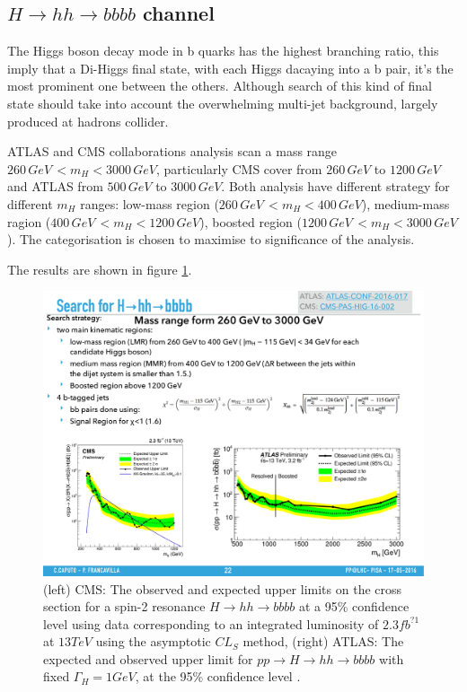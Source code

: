 \subsection{$H\rightarrow hh \rightarrow bbbb$ channel}
The Higgs boson decay mode in b quarks has the highest branching ratio, this imply that a Di-Higgs final state, with each Higgs dacaying into a b pair, it's the most prominent one between the others. Although search of this kind of final state should take into account the overwhelming multi-jet background, largely produced at hadrons collider.

ATLAS and CMS collaborations analysis scan a mass range $260\, GeV \, < m_{H}  <  3000 \, GeV$, particularly CMS cover from $260\, GeV$ to $1200\, GeV$ and ATLAS from $500\, GeV$ to $3000\, GeV$. Both analysis have different strategy for different $m_H$ ranges: low-mass region ($260\, GeV \, < m_{H}  <  400 \, GeV$), medium-mass ragion ($400\, GeV \, < m_{H}  <  1200 \, GeV$), boosted region ($1200\, GeV \, < m_{H}  <  3000 \, GeV$). The categorisation is chosen to maximise to significance of the analysis. 

The results are shown in figure \ref{fig:HH_bbbb}.
\begin{figure}[htb]
\centering
	\includegraphics[width=1.0\textwidth, angle=0] {figures/HH_bbbb.pdf}
\caption{(left) CMS: The observed and expected upper limits on the cross section for a spin-2 resonance
$H\rightarrow hh\rightarrow bbbb$ at a 95\% confidence level using data corresponding to an integrated luminosity
of $2.3 fb^{?1}$ at $13 TeV$ using the asymptotic $CL_S$ method, (right) ATLAS: The expected and observed upper limit for $pp\rightarrow H\rightarrow hh\rightarrow bbbb$ with fixed $\Gamma_H = 1 GeV$, at the 95\% confidence level .}
\label{fig:HH_bbbb}   
\end{figure}
 
